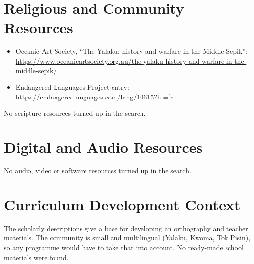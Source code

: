 \documentclass[12pt]{article}
\begin{document}
\section{Religious and Community Resources}
\begin{itemize}
\item Oceanic Art Society, ``The Yalaku: history and warfare in the Middle Sepik'': \url{https://www.oceanicartsociety.org.au/the-yalaku-history-and-warfare-in-the-middle-sepik/}
\item Endangered Languages Project entry: \url{https://endangeredlanguages.com/lang/10615?hl=fr}
\end{itemize}
No scripture resources turned up in the search.

\section{Digital and Audio Resources}
No audio, video or software resources turned up in the search.

\section{Curriculum Development Context}
The scholarly descriptions give a base for developing an orthography and teacher materials. The community is small and multilingual (Yalaku, Kwoma, Tok Pisin), so any programme would have to take that into account. No ready-made school materials were found.
\end{document}
